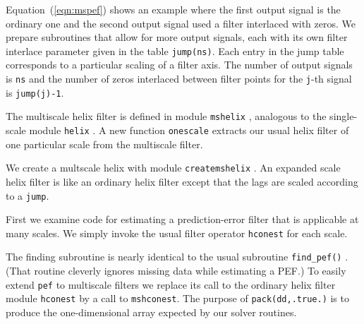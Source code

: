 \par
Equation~(\ref{eqn:mspef}) shows an example
where the first output signal is the ordinary one
and the second output signal used a filter interlaced with zeros.
We prepare subroutines that allow for more output signals,
each with its own filter interlace parameter
given in the table {\tt jump(ns)}.
Each entry in the jump table corresponds to
a particular scaling of a filter axis.
The number of output signals is {\tt ns} and the
number of zeros interlaced between filter points 
for the {\tt j}-th signal is {\tt jump(j)-1}.
\par
The multiscale helix filter is defined in module
\texttt{mshelix} , analogous to the
single-scale module \texttt{helix} .
A new function
\texttt{onescale}
extracts our usual helix filter
of one particular scale
from the multiscale filter.


We create a multscale helix with module
\texttt{createmshelix} .
An expanded scale helix filter is like an ordinary helix filter
except that the lags are scaled according to a \texttt{jump}.


\par
First we examine code for estimating a prediction-error filter
that is applicable at many scales.
We simply invoke the usual filter operator
\texttt{hconest} 
for each scale.




\par
The  finding subroutine
is nearly identical to the usual subroutine
\texttt{find\_pef()} .
(That routine cleverly ignores missing data while estimating a PEF.)
To easily extend {\tt pef} to multiscale filters
we replace its call to the ordinary helix
filter module
\texttt{hconest} 
by a call to \texttt{mshconest}.
The purpose of \texttt{pack(dd,.true.)}
is to produce the one-dimensional array expected by
our solver routines.


